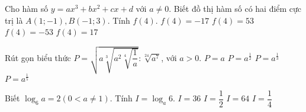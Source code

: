 \begin{ex}%
	Cho hàm số $y=ax^3+bx^2+cx+d$ với $a \ne 0$. Biết đồ thị hàm số có hai điểm cực trị là $A(1; -1), B(-1; 3)$. Tính $f(4)$.
	\choice
	{$f(4)=-17$}
	{\True $f(4)=53$}
	{$f(4)=-53$}
	{$f(4)=17$}	
\end{ex}

\begin{ex}%
	Rút gọn biểu thức $P=\sqrt{a \sqrt[3]{a^2 \sqrt[4]{\dfrac{1}{a}}}}: \sqrt[24]{a^7}$, với $a>0$.
	\choice
	{$P=a$} {\True $P=a^{\frac{1}{2}}$} {$P=a^{\frac{1}{3}}$} {$P=a^{\frac{1}{5}}$}
\end{ex}

\begin{ex}%
	Biết $\log_6 a =2 (0 <a \ne 1)$. Tính $I=\log_a 6$.
	\choice
	{$I=36$}
	{\True $I=\dfrac{1}{2}$}
	{$I=64$}
	{$I=\dfrac{1}{4}$}
	
\end{ex}

